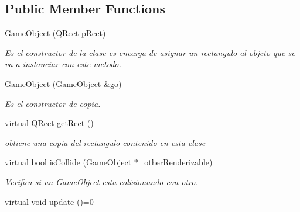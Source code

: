 \subsection*{Public Member Functions}
\begin{DoxyCompactItemize}
\item 
\hyperlink{class_game_object_a439d121ac13b4727d0bbb850e1ada980}{Game\-Object} (Q\-Rect p\-Rect)
\begin{DoxyCompactList}\small\item\em Es el constructor de la clase es encarga de asignar un rectangulo al objeto que se va a instanciar con este metodo. \end{DoxyCompactList}\item 
\hyperlink{class_game_object_aefff75a70a358b683a9e698b05abd3dd}{Game\-Object} (\hyperlink{class_game_object}{Game\-Object} \&go)
\begin{DoxyCompactList}\small\item\em Es el constructor de copia. \end{DoxyCompactList}\item 
virtual Q\-Rect \hyperlink{class_game_object_a529e5908a2c7a95fe3cd0f47958471b4}{get\-Rect} ()
\begin{DoxyCompactList}\small\item\em obtiene una copia del rectangulo contenido en esta clase \end{DoxyCompactList}\item 
virtual bool \hyperlink{class_game_object_a4d7f7506ab6fa6442367844cd8202fb6}{is\-Collide} (\hyperlink{class_game_object}{Game\-Object} $\ast$\-\_\-other\-Renderizable)
\begin{DoxyCompactList}\small\item\em Verifica si un \hyperlink{class_game_object}{Game\-Object} esta colisionando con otro. \end{DoxyCompactList}\item 
\hypertarget{class_game_object_ae83128d0e0efef691417779605ee037c}{virtual void \hyperlink{class_game_object_ae83128d0e0efef691417779605ee037c}{update} ()=0}\label{class_game_object_ae83128d0e0efef691417779605ee037c}


\end{DoxyCompactItemize}
